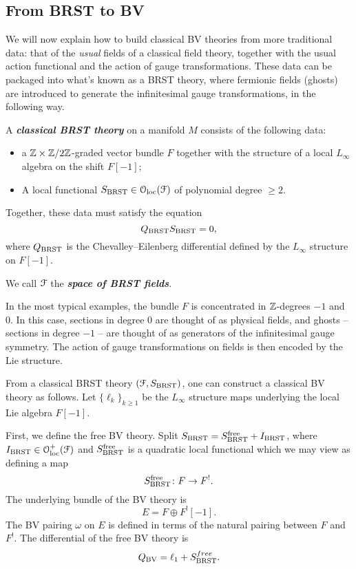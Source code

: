 \documentclass[10pt, oneside]{article}
\newcommand{\defterm}[1]{\textbf{\emph{#1}}}
\begin{document}
\subsection{From BRST to BV}
We will now explain how to build classical BV theories from more traditional data: that of the \emph{usual} fields of a classical field theory, together with the usual action functional and the action of gauge transformations.  These data can be packaged into what's known as a BRST theory, where fermionic fields (ghosts) are introduced to generate the infinitesimal gauge transformations, in the following way.

\begin{definition}
A \defterm{classical BRST theory} on a manifold $M$ consists of the following data:
\begin{itemize}
\item a $\mathbb Z\times\mathbb Z/2\mathbb Z$-graded vector bundle $F$ together with the structure of a local $L_\infty$ algebra on the shift $F[-1]$;
\item A local functional $S_{\mathrm{BRST}} \in \mathcal{O}_{\rm loc}(\mathcal F)$ of polynomial degree $\geq 2$.
\end{itemize}
Together, these data must satisfy the equation
\[Q_{\mathrm{BRST}} S_{\mathrm{BRST}} = 0,\]
where $Q_{\mathrm{BRST}}$ is the Chevalley--Eilenberg differential defined by the $L_\infty$ structure on $F[-1]$. 
\end{definition}

We call $\mathcal F$ the \defterm{space of BRST fields}.

\begin{remark}
In the most typical examples, the bundle $F$ is concentrated in $\mathbb Z$-degrees $-1$ and 0.  In this case, sections in degree 0 are thought of as physical fields, and ghosts -- sections in degree $-1$ -- are thought of as generators of the infinitesimal gauge symmetry.  The action of gauge transformations on fields is then encoded by the Lie structure.
\end{remark}

From a classical BRST theory $(\mathcal F, S_{\mathrm{BRST}})$, one can construct a classical BV theory as follows. Let $\{\ell_k\}_{k\geq 1}$ be the $L_\infty$ structure maps underlying the local Lie algebra $F[-1]$.

First, we define the free BV theory. Split $S_{\mathrm{BRST}} = S^{\mathrm{free}}_{\mathrm{BRST}} + I_{\mathrm{BRST}}$, where $I_{\mathrm{BRST}}\in\mathcal{O}_{\rm loc}^+(\mathcal F)$ and $S^{\mathrm{free}}_{\mathrm{BRST}}$ is a quadratic local functional which we may view as defining a map
\[S^{\mathrm{free}}_{\mathrm{BRST}}\colon F\rightarrow F^!.\]
The underlying bundle of the BV theory is
\[
E = F \oplus F^! [-1].
\]
The BV pairing $\omega$ on $E$ is defined in terms of the natural pairing between $F$ and $F^!$.
The differential of the free BV theory is
\[Q_{\mathrm{BV}} = \ell_1 + S^{free}_{\mathrm{BRST}}.
\]
\end{document}

